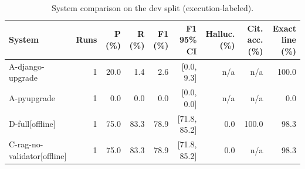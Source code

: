 \begin{table}[t]
\centering
\small
\caption{System comparison on the dev split (execution-labeled).}
\label{tab:comparison-dev}
\begin{tabular}{lrrrrrrrr}
\toprule
System & Runs & P (\%) & R (\%) & F1 (\%) & F1 95\% CI & Halluc. (\%) & Cit. acc. (\%) & Exact line (\%) \\
\midrule
A-django-upgrade & 1 & 20.0 & 1.4 & 2.6 & [0.0, 9.3] & n/a & n/a & 100.0 \\
A-pyupgrade & 1 & 0.0 & 0.0 & 0.0 & [0.0, 0.0] & n/a & n/a & 0.0 \\
D-full[offline] & 1 & 75.0 & 83.3 & 78.9 & [71.8, 85.2] & 0.0 & 100.0 & 98.3 \\
C-rag-no-validator[offline] & 1 & 75.0 & 83.3 & 78.9 & [71.8, 85.2] & 0.0 & n/a & 98.3 \\
\bottomrule
\end{tabular}
\end{table}
